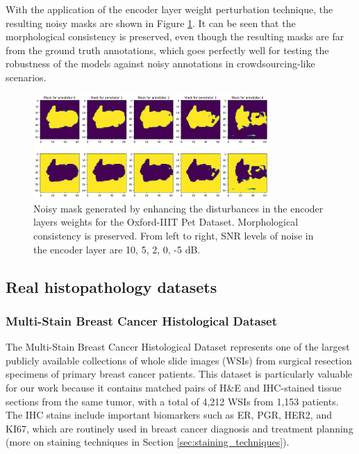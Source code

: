 With the application of the encoder layer weight perturbation technique,
the resulting noisy masks are shown in Figure
\ref{fig:enhanced_disturbances}. It can be seen that the
morphological consistency is preserved, even though the resulting
masks are far from the ground truth annotations, which goes perfectly
well for testing the robustness of the models against noisy
annotations in crowdsourcing-like scenarios.
\begin{figure}[h]
  \centering
  \includegraphics[width=0.8\textwidth]{Cap2/Figures/enhanced_disturbances.png}
  \caption{Noisy mask generated by enhancing the disturbances
    in the encoder layers weights for the Oxford-IIIT Pet Dataset.
    Morphological consistency is preserved. From left to right, SNR
  levels of noise in the encoder layer are 10, 5, 2, 0, -5 dB.}
  \label{fig:enhanced_disturbances}
\end{figure}

\subsection{Real histopathology datasets}

\subsubsection{Multi-Stain Breast Cancer Histological Dataset}

The Multi-Stain Breast Cancer Histological Dataset
\cite{WeitzEtAl2023} represents one of the largest publicly available
collections of whole slide images (WSIs) from surgical resection
specimens of primary breast cancer patients. This dataset is
particularly valuable for our work because it contains matched pairs
of H\&E and IHC-stained tissue sections from the same tumor, with a
total of 4,212 WSIs from 1,153 patients. The IHC stains include
important biomarkers such as ER, PGR, HER2, and KI67, which are
routinely used in breast cancer diagnosis and treatment planning
(more on staining techniques in Section \ref{sec:staining_techniques}).

